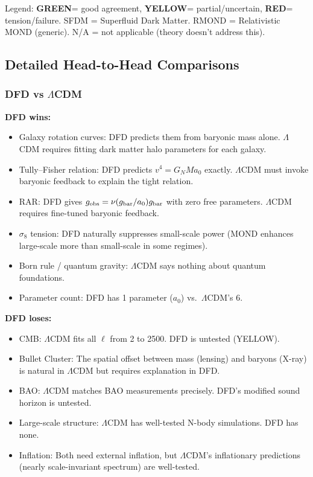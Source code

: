 \documentclass[11pt,a4paper]{article}
\newcommand{\GREEN}{\textcolor{dfdgreen}{\textbf{GREEN}}}
\newcommand{\YELLOW}{\textcolor{dfdyellow}{\textbf{YELLOW}}}
\newcommand{\RED}{\textcolor{dfdred}{\textbf{RED}}}
\begin{document}
Legend: \GREEN = good agreement, \YELLOW = partial/uncertain, \RED = tension/failure. SFDM = Superfluid Dark Matter. RMOND = Relativistic MOND (generic). N/A = not applicable (theory doesn't address this).

\subsection{Detailed Head-to-Head Comparisons}

\subsubsection{DFD vs $\Lambda$CDM}

\textbf{DFD wins:}
\begin{itemize}
\item Galaxy rotation curves: DFD predicts them from baryonic mass alone. $\Lambda$CDM requires fitting dark matter halo parameters for each galaxy.
\item Tully--Fisher relation: DFD predicts $v^4 = G_N M a_0$ exactly. $\Lambda$CDM must invoke baryonic feedback to explain the tight relation.
\item RAR: DFD gives $g_{\rm obs} = \nu(g_{\rm bar}/a_0)g_{\rm bar}$ with zero free parameters. $\Lambda$CDM requires fine-tuned baryonic feedback.
\item $\sigma_8$ tension: DFD naturally suppresses small-scale power (MOND enhances large-scale more than small-scale in some regimes).
\item Born rule / quantum gravity: $\Lambda$CDM says nothing about quantum foundations.
\item Parameter count: DFD has 1 parameter ($a_0$) vs.\ $\Lambda$CDM's 6.
\end{itemize}

\textbf{DFD loses:}
\begin{itemize}
\item CMB: $\Lambda$CDM fits all $\ell$ from 2 to 2500. DFD is untested (YELLOW).
\item Bullet Cluster: The spatial offset between mass (lensing) and baryons (X-ray) is natural in $\Lambda$CDM but requires explanation in DFD.
\item BAO: $\Lambda$CDM matches BAO measurements precisely. DFD's modified sound horizon is untested.
\item Large-scale structure: $\Lambda$CDM has well-tested N-body simulations. DFD has none.
\item Inflation: Both need external inflation, but $\Lambda$CDM's inflationary predictions (nearly scale-invariant spectrum) are well-tested.
\end{itemize}
\end{document}
